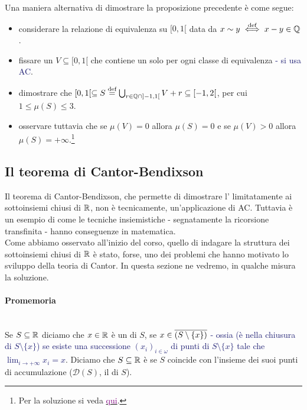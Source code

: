 \begin{exercise}
	Una maniera alternativa di dimostrare la proposizione precedente \`e come segue:
	\begin{itemize}
		\item considerare la relazione di equivalenza su $[0,1[$ data da $x \sim y \overset{\text{def}}{\iff} x - y \in \mathbb Q$.
		\item fissare un $V \subseteq [0,1[$ che contiene un solo per ogni classe di equivalenza \textcolor{MidnightBlue}{- si usa AC}.
		\item dimostrare che $[0,1[ \subseteq S \overset{\text{def}}{=} \bigcup_{r \in \mathbb Q \cap ]-1,1[} V + r \subseteq [-1,2[$, per cui $1 \leq \mu(S) \leq 3$.
		\item osservare tuttavia che se $\mu(V) = 0$ allora $\mu(S) = 0$ e se $\mu(V) > 0$ allora $\mu(S) = +\infty$.\footnote{Per la soluzione si veda \href{https://it.wikipedia.org/wiki/Insieme_di_Vitali}{\textcolor{purple}{qui}}.}
	\end{itemize}
\end{exercise}


\subsection{\texorpdfstring{\;Il teorema di Cantor-Bendixson}{Il teorema di Cantor-Bendixson}}
Il teorema di Cantor-Bendixson, che permette di dimostrare l' limitatamente ai sottoinsiemi chiusi di $\mathbb R$, non \`e tecnicamente, un'applicazione di AC.
Tuttavia \`e un esempio di come le tecniche insiemistiche - segnatamente la ricorsione transfinita - hanno conseguenze in matematica.\\
Come abbiamo osservato all'inizio del corso, quello di indagare la struttura dei sottoinsiemi chiusi di $\mathbb R$ \`e stato, forse, uno dei problemi che hanno motivato lo sviluppo della teoria di Cantor. In 
questa sezione ne vedremo, in qualche misura la soluzione.

\paragraph*{Promemoria}\mbox{}\\
Se $S \subseteq \mathbb R$ diciamo che $x \in \mathbb R$ \`e un  di $S$, se $x \in \overline{(S \setminus \{x\})}$ \textcolor{MidnightBlue}{- ossia (\`e nella chiusura di $S\setminus\{x\}$) se esiste una successione $(x_i)_{i \in \omega}$ di 
punti di $S \setminus \{x\}$ tale che $\lim_{i \to +\infty} x_i = x$}. Diciamo che $S \subseteq \mathbb R$ \`e  se $S$ coincide con l'insieme dei suoi punti di accumulazione ($\mathcal{D}(S)$, il  di $S$).

